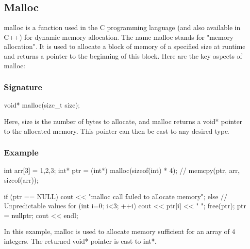 \documentclass{report}
\begin{document}
    \bigbreak \noindent 
    \subsection{Malloc}
    \bigbreak \noindent 
    \begin{concept}
        malloc is a function used in the C programming language (and also available in C++) for dynamic memory allocation. The name malloc stands for "memory allocation". It is used to allocate a block of memory of a specified size at runtime and returns a pointer to the beginning of this block. Here are the key aspects of malloc:
    \end{concept}
    \bigbreak \noindent 
    \subsubsection{Signature}
    \bigbreak \noindent 
    \begin{cppcode}
    void* malloc(size_t size);
    \end{cppcode}
    \bigbreak \noindent 
    Here, size is the number of bytes to allocate, and malloc returns a void* pointer to the allocated memory. This pointer can then be cast to any desired type.
    \bigbreak \noindent 
    \subsubsection{Example}
    \begin{cppcode}
    int arr[3] = {1,2,3};
    int* ptr = (int*) malloc(sizeof(int) * 4);
    // memcpy(ptr, arr, sizeof(arr));

    if (ptr == NULL) { cout << "malloc call failed to allocate memory";
    } else {
        // Unpredictable values
        for (int i=0; i<3; ++i)  {
            cout << ptr[i] << " ";
        }
    }
    free(ptr);
    ptr = nullptr;
    cout << endl;
    \end{cppcode}
    \bigbreak \noindent 
    In this example, malloc is used to allocate memory sufficient for an array of 4 integers. The returned void* pointer is cast to int*.

    \bigbreak \noindent 
\end{document}
